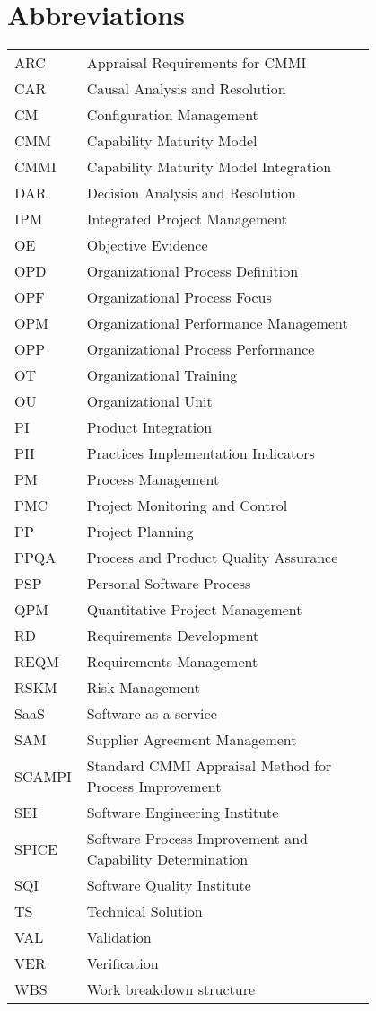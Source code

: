 \chapter*{Abbreviations}

\begin{flushleft}
	\begin{tabular}{l p{0.8\linewidth}}
		ARC & Appraisal Requirements for CMMI\\
		CAR & Causal Analysis and Resolution\\
		CM & Configuration Management\\
		CMM & Capability Maturity Model\\
		CMMI & Capability Maturity Model Integration\\
		DAR & Decision Analysis and Resolution\\
		IPM & Integrated Project Management\\
		OE & Objective Evidence\\
		OPD & Organizational Process Definition\\
		OPF & Organizational Process Focus\\
		OPM & Organizational Performance Management\\
		OPP & Organizational Process Performance\\
		OT & Organizational Training\\
		OU & Organizational Unit\\
		PI & Product Integration\\
		PII & Practices Implementation Indicators\\
		PM & Process Management\\
		PMC & Project Monitoring and Control\\
		PP & Project Planning\\
		PPQA & Process and Product Quality Assurance\\
		PSP & Personal Software Process\\
		QPM & Quantitative Project Management\\
		RD & Requirements Development\\
		REQM & Requirements Management\\
		RSKM & Risk Management\\
		SaaS & Software-as-a-service\\
		SAM & Supplier Agreement Management\\
		SCAMPI & Standard CMMI Appraisal Method for Process Improvement\\
		SEI & Software Engineering Institute\\
		SPICE & Software Process Improvement and Capability Determination\\
		SQI & Software Quality Institute\\
		TS & Technical Solution\\
		VAL & Validation\\
		VER & Verification\\
		WBS &  Work breakdown structure\\
	\end{tabular}
\end{flushleft}
